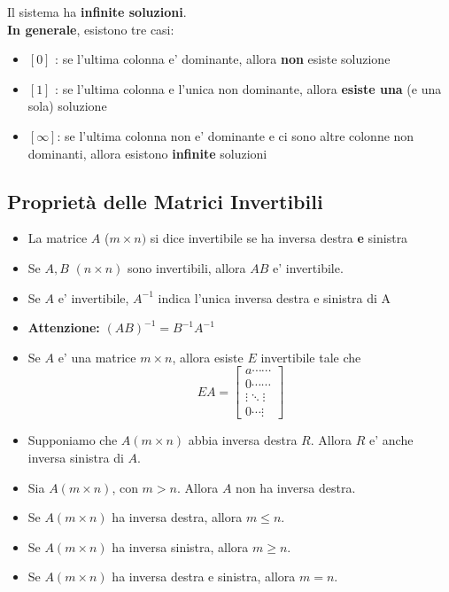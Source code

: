 \documentclass[a4paper, 10pt]{article}
\begin{document}
	Il sistema ha \textbf{infinite soluzioni}. \\
	\textbf{In generale}, esistono tre casi:
	\begin{itemize}
		\item $[0]$ : se l'ultima colonna e' dominante, allora \textbf{non} esiste soluzione
		\item $[1]$ : se l'ultima colonna e l'unica non dominante, allora \textbf{esiste una} (e una sola) soluzione
		\item $[\infty]$: se l'ultima colonna non e' dominante e ci sono altre colonne non dominanti, 
						  allora esistono \textbf{infinite} soluzioni
	\end{itemize}
	
	\subsection{Proprietà delle Matrici Invertibili}
		\begin{itemize}
		 	\item La matrice $A$ ($m \times n)$ si dice invertibile se ha inversa destra \textbf{e} sinistra
			\item  Se $A,B$ $(n \times n)$ sono invertibili, allora $AB$ e' invertibile.
		 	\item Se $A$ e' invertibile, $A^{-1}$ indica l'unica inversa destra e sinistra di A
		 	\item \textbf{Attenzione:} $(AB)^{-1} = B^{-1}A^{-1}$
		 	\item Se $A$ e' una matrice $m \times n$, allora esiste $E$ invertibile tale che 
		 		\[ EA = 
		 			\begin{bmatrix}
		 				a \cdots \cdots \\
		 				0 \cdots \cdots \\
		 				\vdots \ddots \vdots \\
		 				0 \cdots \vdots 
		 			\end{bmatrix}
		 		\]
		 	\item Supponiamo che $A (m \times n)$ abbia inversa destra $R$. Allora $R$ e' anche inversa sinistra di $A$.
		 	\item Sia $A (m \times n)$, con $m > n$. Allora $A$ non ha inversa destra.
		 	\item Se $A (m \times n)$ ha inversa destra, allora $m \leq n$.
		 	\item Se $A (m \times n)$ ha inversa sinistra, allora $m \geq n$.
		 	\item Se $A (m \times n)$ ha inversa destra e sinistra, allora $m = n$.
		\end{itemize}
		
\end{document}
